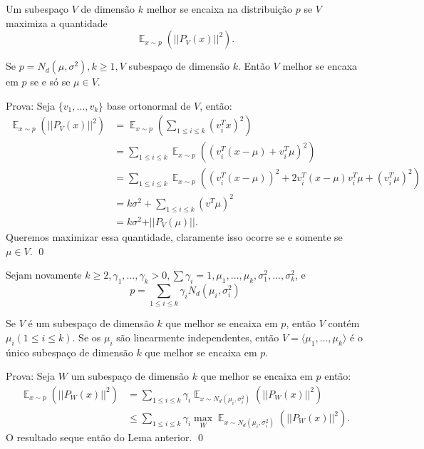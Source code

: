 \begin{definicao}
Um subespa\c{c}o $V$ de dimens\~ao $k$ melhor se encaixa na distribui\c{c}\~ao $p$ se $V$ maximiza a quantidade 
\[\displaystyle \mathop{\mathbb{E}}_{x \sim p} \left( \vert\vert P_V (x)\vert\vert^2\right).\]
\end{definicao}

\begin{lema}
Se $p = N_d(\mu, \sigma^2), k \ge 1, V$ subespa\c{c}o de dimens\~ao $k$. Ent\~ao $V$ melhor se encaxa em $p$ se e s\'o se $\mu \in V.$
\end{lema}

Prova: Seja $\{v_1,\dots,v_k\}$ base ortonormal de $V$, ent\~ao:
\begin{align*}
\displaystyle \mathop{\mathbb{E}}_{x \sim p} \left(\vert\vert P_V(x)\vert\vert^2\right) &= \displaystyle \mathop{\mathbb{E}}_{x \sim p} \left( \sum_{1\le i\le k} (v_i^Tx)^2\right)\\
																   &=\displaystyle \sum_{1\le i\le k}\mathop{\mathbb{E}}_{x \sim p} \left((v_i^T(x-\mu) + v_i^T\mu)^2\right)\\
																   &= \displaystyle \sum_{1\le i\le k}\mathop{\mathbb{E}}_{x \sim p} \left((v_i^T(x- \mu))^2 + 2v_i^T(x-\mu)v_i^T\mu + (v_i^T\mu)^2\right)\\
																   &= k\sigma^2 + \sum_{1\le i\le k}(v^T\mu)^2\\
																   &= k\sigma^2 + \vert\vert P_V(\mu)\vert\vert.			   
\end{align*}
Queremos maximizar essa quantidade, claramente isso ocorre se e somente se $\mu \in V$. \qed

Sejam novamente $k \ge 2, \gamma_1,\dots,\gamma_k>0, \sum \gamma_i = 1, \mu_1,\dots, \mu_k, \sigma_1^2, \dots, \sigma_k^2$, e 
\[p = \displaystyle\sum_{1\le i \le k} \gamma_iN_d(\mu_i, \sigma_i^2)\]

\begin{teorema}
Se $V$ \'e um subespa\c{c}o de dimens\~ao $k$ que melhor se encaixa em $p$, ent\~ao $V$ cont\'em $\mu_i (1\le i \le k)$. Se os $\mu_i$ s\~ao linearmente independentes, ent\~ao $V= \langle \mu_1,\dots, \mu_k\rangle$ \'e o \'unico subespa\c{c}o de dimens\~ao $k$ que melhor se encaixa em $p$.
\end{teorema}
Prova: Seja $W$ um subespa\c{c}o de dimens\~ao $k$ que melhor se encaixa em $p$ ent\~ao:
\begin{align*}
\displaystyle \mathop{\mathbb{E}}_{x \sim p} \left( \vert\vert P_W (x)\vert\vert^2\right)&= \sum_{1\le i \le k} \gamma_i\displaystyle \mathop{\mathbb{E}}_{x \sim N_d(\mu_i,\sigma_i^2)} \left( \vert\vert P_W (x)\vert\vert^2\right)\\
								&\le   \sum_{1\le i \le k} \gamma_i \max_{W}\displaystyle \mathop{\mathbb{E}}_{x \sim N_d(\mu_i,\sigma_i^2)} \left( \vert\vert P_W (x)\vert\vert^2\right).
\end{align*}
O resultado seque ent\~ao do Lema anterior. \qed

